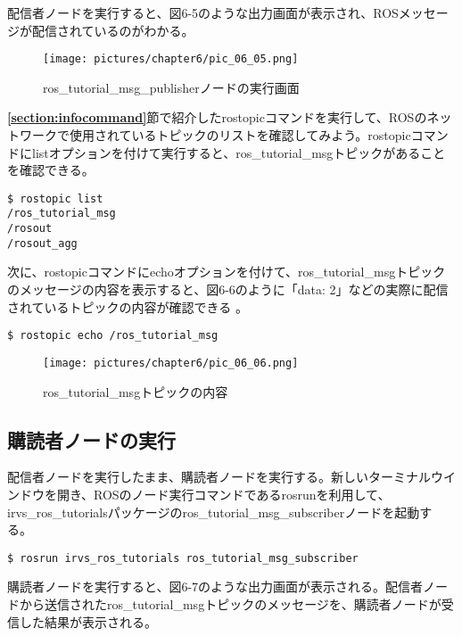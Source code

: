 配信者ノードを実行すると、図6-5のような出力画面が表示され、ROSメッセージが配信されているのがわかる。

\begin{figure}[h]
  \centering
  \texttt{[image: pictures/chapter6/pic\_06\_05.png]}
  \caption{ros\_tutorial\_msg\_publisherノードの実行画面}
\end{figure}

\textbf{\ref{section:infocommand}}節で紹介したrostopicコマンドを実行して、ROSのネットワークで使用されているトピックのリストを確認してみよう。rostopicコマンドにlistオプションを付けて実行すると、ros\_tutorial\_msgトピックがあることを確認できる。

\begin{lstlisting}[language=ROS]
$ rostopic list
/ros_tutorial_msg
/rosout
/rosout_agg
\end{lstlisting}

次に、rostopicコマンドにechoオプションを付けて、ros\_tutorial\_msgトピックのメッセージの内容を表示すると、図6-6のように「data: 2」などの実際に配信されているトピックの内容が確認できる  。

\begin{lstlisting}[language=ROS]
$ rostopic echo /ros_tutorial_msg
\end{lstlisting}

\begin{figure}[h]
  \centering
  \texttt{[image: pictures/chapter6/pic\_06\_06.png]}
  \caption{ros\_tutorial\_msgトピックの内容}
\end{figure}

\subsection{購読者ノードの実行}

配信者ノードを実行したまま、購読者ノードを実行する。新しいターミナルウインドウを開き、ROSのノード実行コマンドであるrosrunを利用して、irvs\_ros\_tutorialsパッケージのros\_tutorial\_msg\_subscriberノードを起動する。

\begin{lstlisting}[language=ROS]
$ rosrun irvs_ros_tutorials ros_tutorial_msg_subscriber
\end{lstlisting}

購読者ノードを実行すると、図6-7のような出力画面が表示される。配信者ノードから送信されたros\_tutorial\_msgトピックのメッセージを、購読者ノードが受信した結果が表示される。

